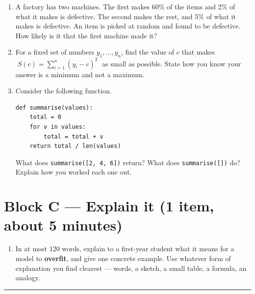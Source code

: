 \documentclass[11pt]{article}
\begin{document}
\begin{enumerate}[label=B\arabic*.,leftmargin=*]
  \item A factory has two machines. The first makes 60\% of the items and 2\% of what it makes is
    defective. The second makes the rest, and 5\% of what it makes is defective. An item is picked at
    random and found to be defective. How likely is it that the first machine made it?

    \vspace{45mm}

  \item For a fixed set of numbers $y_1, \dots, y_n$, find the value of $c$ that makes
    $\;S(c) = \sum_{i=1}^{n} (y_i - c)^2\;$ as small as possible. State how you know your answer is a
    minimum and not a maximum.

    \vspace{45mm}

  \item Consider the following function.
\begin{lstlisting}
def summarise(values):
    total = 0
    for v in values:
        total = total + v
    return total / len(values)
\end{lstlisting}
    What does \texttt{summarise([2, 4, 6])} return? What does \texttt{summarise([])} do?
    Explain how you worked each one out.

    \vspace{35mm}
\end{enumerate}

\newpage

\section*{Block C --- Explain it \hfill \normalfont\small(1 item, about 5 minutes)}
\begin{enumerate}[label=C\arabic*.,leftmargin=*]
  \item In at most 120 words, explain to a first-year student what it means for a model to
    \textbf{overfit}, and give one concrete example. Use whatever form of explanation you find
    clearest --- words, a sketch, a small table, a formula, an analogy.

    \vspace{75mm}
\end{enumerate}

\bigskip\hrule\bigskip
\end{document}
